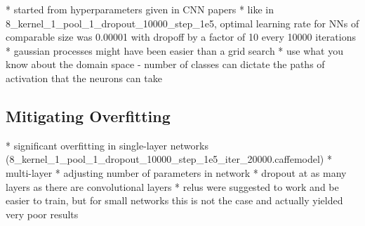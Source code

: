 \documentclass[10pt]{article}
\begin{document}
* started from hyperparameters given in CNN papers
* like in 8_kernel_1_pool_1_dropout_10000_step_1e5, optimal learning rate for NNs of comparable size was 0.00001 with dropoff by a factor of 10 every 10000 iterations
* gaussian processes might have been easier than a grid search
* use what you know about the domain space - number of classes can dictate the paths of activation that the neurons can take

\subsection{Mitigating Overfitting}

* significant overfitting in single-layer networks (8_kernel_1_pool_1_dropout_10000_step_1e5_iter_20000.caffemodel)
* multi-layer
* adjusting number of parameters in network
* dropout at as many layers as there are convolutional layers
* relus were suggested to work and be easier to train, but for small networks this is not the case and actually yielded very poor results




\end{document}
